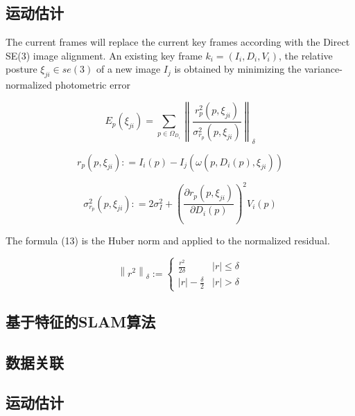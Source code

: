 \subsection*{运动估计}



The current frames will replace the current key frames according with the Direct SE(3) image alignment. An existing key frame ${k_i} = ({I_i},{D_i},{V_i})$, the relative posture ${\xi _{ji}} \in se(3)$ of a new image ${I_j}$ is obtained by minimizing the variance-normalized photometric error

\begin{equation}
E_{p}(\xi _{ji}) = \sum\limits_{p \in \Omega _{D_{i}}} \left\|  \frac{r_{p}^{2} (p,\xi_{ji})}{\sigma_{r_{p}}^{2} (p,\xi_{ji})}  \right\|_{\delta}
\end{equation}


\begin{equation}
r_{p}(p,\xi _{ji}): = I_{i}(p) - I_{j}(\omega (p,D_{i}(p),\xi _{ji}))
\end{equation}

\begin{equation}
\sigma _{r_{p}} ^{2}(p,\xi _{ji}): = 2\sigma _{I} ^{2} + {\left( \frac {\partial r_{p}(p,\xi_{ji})} {\partial D_{i} (p)} \right)^{2}} V_{i}(p)
\end{equation}

The formula (13) is the Huber norm and applied to the normalized residual.

\begin{equation}
{\left\| r^{2} \right\|_{\delta}}:=\left\{\begin{array}{ll}
\frac {r^{2}} {2\delta}            & |r|\leq \delta       \\
|r|-\frac {\delta} {2}      & |r| > \delta
\end{array} \right.
\end{equation}




\subsection{基于特征的SLAM算法}

\subsection*{数据关联}

\subsection*{运动估计}


